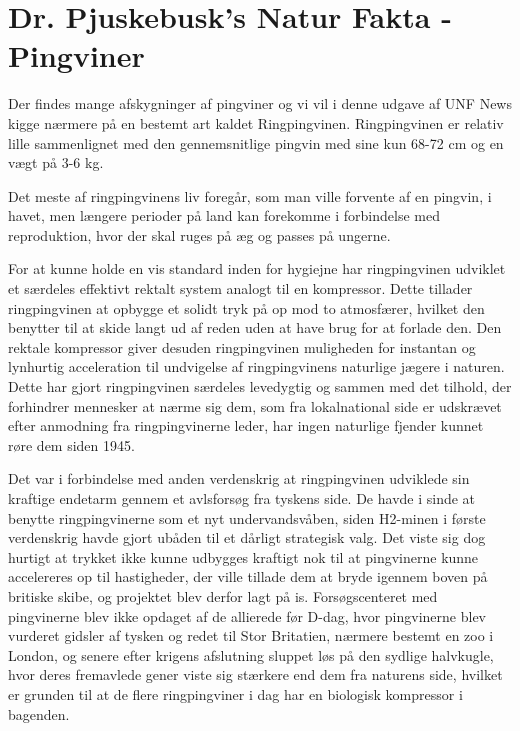 \begin{minipage}[t]{170mm}
\vspace{3mm}
\section*{Dr. Pjuskebusk's Natur Fakta - Pingviner}

Der findes mange afskygninger af pingviner og vi vil i denne udgave af UNF News kigge nærmere på en bestemt art kaldet Ringpingvinen. Ringpingvinen er relativ lille sammenlignet med den gennemsnitlige pingvin med sine kun 68-72 cm og en vægt på 3-6 kg.

Det meste af ringpingvinens liv foregår, som man ville forvente af en pingvin, i havet, men længere perioder på land kan forekomme i forbindelse med reproduktion, hvor der skal ruges på æg og passes på ungerne.

For at kunne holde en vis standard inden for hygiejne har ringpingvinen udviklet et særdeles effektivt rektalt system analogt til en kompressor. Dette tillader ringpingvinen at opbygge et solidt tryk på op mod to atmosfærer, hvilket den benytter til at skide langt ud af reden uden at have brug for at forlade den. Den rektale kompressor giver desuden ringpingvinen muligheden for instantan og lynhurtig acceleration til undvigelse af ringpingvinens naturlige jægere i naturen. Dette har gjort ringpingvinen særdeles levedygtig og sammen med det tilhold, der forhindrer mennesker at nærme sig dem, som fra lokalnational side er udskrævet efter anmodning fra ringpingvinerne leder, har ingen naturlige fjender kunnet røre dem siden 1945.

Det var i forbindelse med anden verdenskrig at ringpingvinen udviklede sin kraftige endetarm gennem et avlsforsøg fra tyskens side. De havde i sinde at benytte ringpingvinerne som et nyt undervandsvåben, siden H2-minen i første verdenskrig havde gjort ubåden til et dårligt strategisk valg. Det viste sig dog hurtigt at trykket ikke kunne udbygges kraftigt nok til at pingvinerne kunne accelereres op til hastigheder, der ville tillade dem at bryde igennem boven på britiske skibe, og projektet blev derfor lagt på is. Forsøgscenteret med pingvinerne blev ikke opdaget af de allierede før D-dag, hvor pingvinerne blev vurderet gidsler af tysken og redet til Stor Britatien, nærmere bestemt en zoo i London, og senere efter krigens afslutning sluppet løs på den sydlige halvkugle, hvor deres fremavlede gener viste sig stærkere end dem fra naturens side, hvilket er grunden til at de flere ringpingviner i dag har en biologisk kompressor i bagenden.


\end{minipage}
